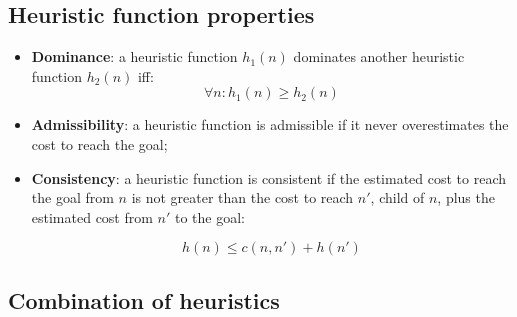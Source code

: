 \documentclass{article}
\begin{document}
\newpage

\subsection{Heuristic function properties}

\begin{itemize}
    \item \textbf{Dominance}: a heuristic function $h_1(n)$ dominates another heuristic function $h_2(n)$ iff:
    \begin{equation}
        \forall n : h_1(n) \geq h_2(n)
    \end{equation}

    \item \textbf{Admissibility}: a heuristic function is admissible if it never overestimates the cost to reach the goal;

    \item \textbf{Consistency}: a heuristic function is consistent if the estimated cost to reach the goal from $n$ is not greater than the cost to reach $n'$, child of $n$, plus the estimated cost from $n'$ to the goal:

    \begin{equation}
        h(n) \leq c(n,n') + h(n')
    \end{equation}

\begin{center}
\end{center}    
\end{itemize}

\subsection{Combination of heuristics}
\end{document}

